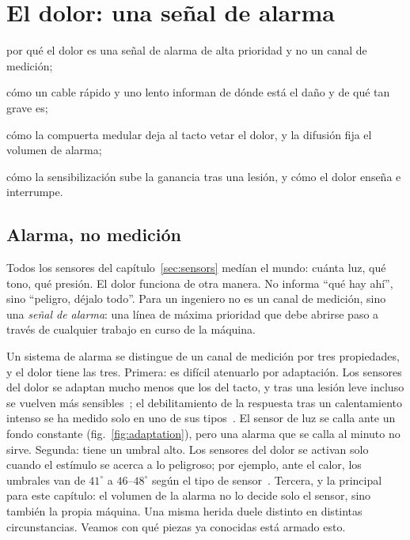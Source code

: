 \chapter{El dolor: una señal de alarma}
\label{sec:pain}
\begin{chaptergoals}
\item por qué el dolor es una señal de alarma de alta prioridad y no un canal de medición;
\item cómo un cable rápido y uno lento informan de dónde está el daño y de qué tan grave es;
\item cómo la compuerta medular deja al tacto vetar el dolor, y la difusión fija el volumen de alarma;
\item cómo la sensibilización sube la ganancia tras una lesión, y cómo el dolor enseña e interrumpe.
\end{chaptergoals}

\section{Alarma, no medición}

Todos los sensores del capítulo~\ref{sec:sensors} medían el mundo: cuánta luz, qué tono, qué presión. El dolor funciona de otra manera. No informa “qué hay ahí”, sino “peligro, déjalo todo”. Para un ingeniero no es un canal de medición, sino una \emph{señal de alarma}: una línea de máxima prioridad que debe abrirse paso a través de cualquier trabajo en curso de la máquina.

Un sistema de alarma se distingue de un canal de medición por tres propiedades, y el dolor tiene las tres. Primera: es difícil atenuarlo por adaptación. Los sensores del dolor se adaptan mucho menos que los del tacto, y tras una lesión leve incluso se vuelven más sensibles~\cite{LaMotte1982hyper}; el debilitamiento de la respuesta tras un calentamiento intenso se ha medido solo en uno de sus tipos~\cite{Treede1995heat}. El sensor de luz se calla ante un fondo constante (fig.~\ref{fig:adaptation}), pero una alarma que se calla al minuto no sirve. Segunda: tiene un umbral alto. Los sensores del dolor se activan solo cuando el estímulo se acerca a lo peligroso; por ejemplo, ante el calor, los umbrales van de $41^\circ$ a $46$--$48^\circ$ según el tipo de sensor~\cite{Treede1995heat, Weidner1999cfib}. Tercera, y la principal para este capítulo: el volumen de la alarma no lo decide solo el sensor, sino también la propia máquina. Una misma herida duele distinto en distintas circunstancias. Veamos con qué piezas ya conocidas está armado esto.

